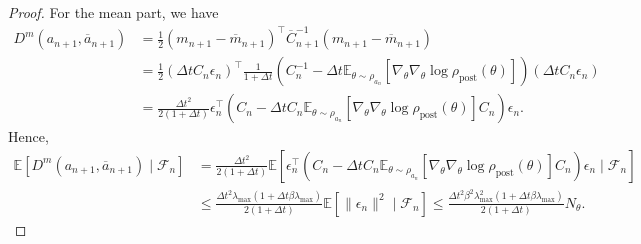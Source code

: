 \documentclass[11pt]{article}
\theoremstyle{plain}
\theoremstyle{definition}
\theoremstyle{remark}
\newcommand{\E}{\mathbb{E}}
\newcommand{\post}{\mathrm{post}}
\begin{document}
\begin{proof}
    For the mean part, we have 
    \begin{align*}
        D^m (a_{n+1}, \overline{a}_{n+1}) &= \frac{1}{2} (m_{n+1} - \overline{m}_{n+1})^\top \overline{C}_{n+1}^{-1} (m_{n+1} - \overline{m}_{n+1}) \\
        &= \frac{1}{2} (\Delta t C_n \epsilon_n)^\top \frac{1}{1 + \Delta t} (C_n^{-1} - \Delta t \E_{\theta \sim \rho_{a_n}}[\nabla_\theta \nabla_\theta \log \rho_\post (\theta)]) (\Delta t C_n \epsilon_n) \\
        &= \frac{\Delta t^2}{2 (1 + \Delta t)} \epsilon_n^\top (C_n - \Delta t C_n \E_{\theta \sim \rho_{a_n}}[\nabla_\theta \nabla_\theta \log \rho_\post (\theta)] C_n) \epsilon_n.
    \end{align*}
    Hence, 
    \begin{align*}
        \E[D^m (a_{n+1}, \overline{a}_{n+1}) \mid \mathcal{F}_n] &= \frac{\Delta t^2}{2 (1 + \Delta t)} \E[\epsilon_n^\top (C_n - \Delta t C_n \E_{\theta \sim \rho_{a_n}}[\nabla_\theta \nabla_\theta \log \rho_\post (\theta)] C_n) \epsilon_n \mid \mathcal{F}_n] \\
        &\leq \frac{\Delta t^2 \lambda_{\max} (1 + \Delta t \beta \lambda_{\max})}{2 (1 + \Delta t)} \E[\|\epsilon_n\|^2 \mid \mathcal{F}_n] \leq \frac{\Delta t^2 \beta^2 \lambda_{\max}^2 (1 + \Delta t \beta \lambda_{\max})}{2 (1 + \Delta t)} N_\theta.
    \end{align*}


\end{proof}
\end{document}

